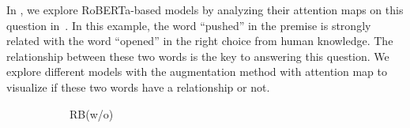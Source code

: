 In , we explore RoBERTa-based models by 
analyzing their attention maps on this question in~.  
In this example, the word ``pushed'' in the premise is strongly
related with the word ``opened'' in the right choice from human knowledge. 
The relationship between these two words is the key to answering this question. 
We explore different models with the augmentation method with attention map 
to visualize if these two words have a relationship or not.
\begin{figure}[th!]
\centering
\begin{subfigure}[b]{0.20\textwidth}
\centering

\caption{RB(w/o)}
\label{fig:case_original}
\end{subfigure}
\hfill
\begin{subfigure}[b]{0.20\textwidth}
\centering

\end{subfigure}
\end{figure}

